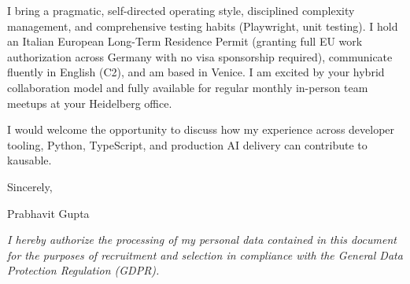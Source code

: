 \documentclass[11pt,a4paper]{article}
\begin{document}
I bring a pragmatic, self-directed operating style, disciplined complexity management, and comprehensive testing habits (Playwright, unit testing). I hold an Italian European Long-Term Residence Permit (granting full EU work authorization across Germany with no visa sponsorship required), communicate fluently in English (C2), and am based in Venice. I am excited by your hybrid collaboration model and fully available for regular monthly in-person team meetups at your Heidelberg office.

I would welcome the opportunity to discuss how my experience across developer tooling, Python, TypeScript, and production AI delivery can contribute to kausable.

Sincerely,

Prabhavit Gupta

\vspace{0.8em}
{\footnotesize \textit{I hereby authorize the processing of my personal data contained in this document for the purposes of recruitment and selection in compliance with the General Data Protection Regulation (GDPR).}\par}
\end{document}
